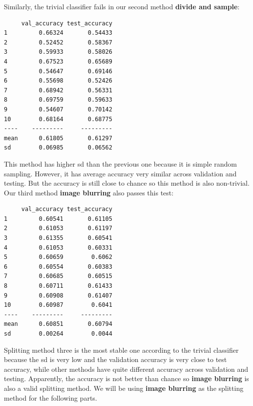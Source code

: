 \documentclass[jou]{apa}%
\begin{document}
\indent Similarly, the trivial classifier fails in our second method \textbf{divide and sample}: 
\begin{verbatim}
     val_accuracy test_accuracy
1         0.66324       0.54433
2         0.52452       0.58367
3         0.59933       0.58026
4         0.67523       0.65689
5         0.54647       0.69146
6         0.55698       0.52426
7         0.68942       0.56331
8         0.69759       0.59633
9         0.54607       0.70142
10        0.68164       0.68775
----    ---------     ---------
mean      0.61805       0.61297
sd        0.06985       0.06562
\end{verbatim}
This method has higher sd than the previous one because it is simple random sampling. However, it has average accuracy very similar across validation and testing. But the accuracy is still close to chance so this method is also non-trivial.
\indent Our third method \textbf{image blurring} also passes this test:
\begin{verbatim}
     val_accuracy test_accuracy
1         0.60541       0.61105
2         0.61053       0.61197
3         0.61355       0.60541
4         0.61053       0.60331
5         0.60659        0.6062
6         0.60554       0.60383
7         0.60685       0.60515
8         0.60711       0.61433
9         0.60908       0.61407
10        0.60987        0.6041
----    ---------     ---------
mean      0.60851       0.60794
sd        0.00264        0.0044
\end{verbatim}
Splitting method three is the most stable one according to the trivial classifier because the sd is very low and the validation accuracy is very close to test accuracy, while other methods have quite different accuracy across validation and testing. Apparently, the accuracy is not better than chance so \textbf{image blurring} is also a valid splitting method. We will be using \textbf{image blurring} as the splitting method for the following parts.
\end{document}
